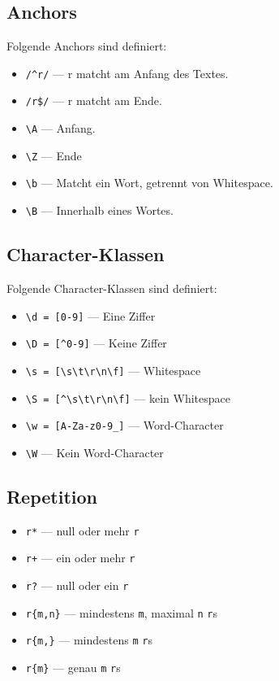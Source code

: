 \documentclass[a4book,11pt,twoside]{scrbook}
\begin{document}


\subsection*{Anchors} %
\label{ssub:anchors}
Folgende Anchors sind definiert:

\begin{itemize}
	\item \lstinline{/^r/}  — r matcht am Anfang des Textes.
	\item \texttt{/r\$/} — r matcht am Ende.
	\item \lstinline{\A}  — Anfang.
	\item \lstinline{\Z}  — Ende
	\item \lstinline{\b} — Matcht ein Wort, getrennt von Whitespace.
	\item \lstinline{\B} — Innerhalb eines Wortes.
\end{itemize}




\subsection*{Character-Klassen} %
\label{sub:character_klassen}
Folgende Character-Klassen sind definiert:

\begin{itemize}
	\item \lstinline{\d = [0-9]} — Eine Ziffer
	\item \lstinline{\D = [^0-9]} — Keine Ziffer
	\item \lstinline{\s = [\s\t\r\n\f]} — Whitespace
	\item \lstinline{\S = [^\s\t\r\n\f]} — kein Whitespace
	\item \lstinline{\w = [A-Za-z0-9_]} — Word-Character
	\item \lstinline{\W} — Kein Word-Character
\end{itemize}

\subsection*{Repetition} %
\label{sub:repetition}
\begin{itemize}
	\item \texttt{r*} — null oder mehr \texttt{r}
	\item \texttt{r+} — ein oder mehr \texttt{r} 
	\item \texttt{r?} — null oder ein \texttt{r} 
	\item \texttt{r\{m,n\}} — mindestens \texttt{m}, maximal \texttt{n} \texttt{r}s
	\item \texttt{r\{m,\}} — mindestens \texttt{m} \texttt{r}s
	\item \texttt{r\{m\}} — genau \texttt{m} \texttt{r}s
\end{itemize}
\end{document}
